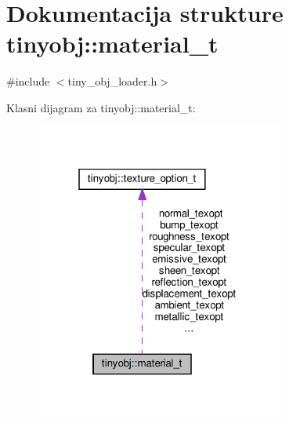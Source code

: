 \hypertarget{structtinyobj_1_1material__t}{}\section{Dokumentacija strukture tinyobj\+:\+:material\+\_\+t}
\label{structtinyobj_1_1material__t}


{\ttfamily \#include $<$tiny\+\_\+obj\+\_\+loader.\+h$>$}



Klasni dijagram za tinyobj\+:\+:material\+\_\+t\+:\nopagebreak
\begin{figure}[H]
\begin{center}
\leavevmode
\includegraphics[width=232pt]{structtinyobj_1_1material__t__coll__graph}
\end{center}
\end{figure}
